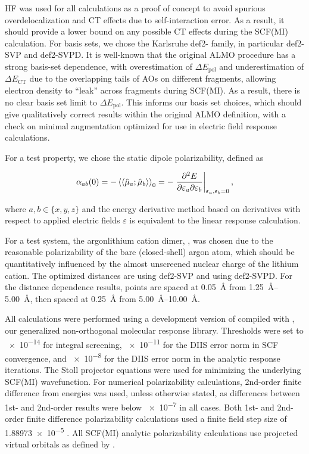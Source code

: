 \documentclass[%
  class = book,%
  crop = false,%
  float = true,%
  multi = true,%
  preview = false,%
]{standalone}
\let\cite\autocite
\newcommand{\arlidimer}{\ce{Ar\bond{....}Li+}}
\begin{document}
HF was used for all calculations as a proof of concept to avoid spurious overdelocalization and CT effects due to self-interaction error. As a result, it should provide a lower bound on any possible CT effects during the SCF(MI) calculation. For basis sets, we chose the Karlsruhe def2- family\cite{Weigend_2005_3297,Rappoport_2010_134105}, in particular def2-SVP and def2-SVPD. It is well-known that the original ALMO procedure has a strong basis-set dependence, with overestimation of \(\Delta E_{\text{pol}}\) and underestimation of \(\Delta E_{\text{CT}}\) due to the overlapping tails of AOs on different fragments, allowing electron density to ``leak'' across fragments during SCF(MI)\cite{doi:10.1063/1.4792434}. As a result, there is no clear basis set limit to \(\Delta E_{\text{pol}}\). This informs our basis set choices, which should give qualitatively correct results within the original ALMO definition, with a check on minimal augmentation optimized for use in electric field response calculations.

For a test property, we chose the static dipole polarizability, defined as

\begin{equation}
  \alpha_{ab}(0) = -\braket{\braket{\hat{\mu}_{a}; \hat{\mu}_{b}}}_{0} = -\left.\frac{\partial^{2} E}{\partial \varepsilon_a \partial \varepsilon_b}\right|_{\varepsilon_{a},\varepsilon_{b}=0},
\end{equation}

where \(a,b \in \{x,y,z\}\) and the energy derivative method based on derivatives with respect to applied electric fields \(\varepsilon\) is equivalent to the linear response calculation.

For a test system, the argon\textemdash{}lithium cation dimer, \arlidimer{}, was chosen due to the reasonable polarizability of the bare (closed-shell) argon atom, which should be quantitatively influenced by the almost unscreened nuclear charge of the lithium cation. The optimized distances are \geomdeftsvp{} using def2-SVP and \geomdeftsvpd{} using def2-SVPD. For the distance dependence results, points are spaced at \SI{0.05}{\angstrom} from \SIrange{1.25}{5.00}{\angstrom}, then spaced at \SI{0.25}{\angstrom} from \SIrange{5.00}{10.00}{\angstrom}.

All calculations were performed using a development version of \qchem{}\cite{Shao2015} compiled with \libresponse{}, our generalized non-orthogonal molecular response library. Thresholds were set to \num{e-14} for integral screening, \num{e-11} for the DIIS error norm in SCF convergence, and \num{e-8} for the DIIS error norm in the analytic response iterations. The Stoll projector equations were used for minimizing the underlying SCF(MI) wavefunction\cite{Stoll_1980_169,Khaliullin2006}. For numerical polarizability calculations, 2nd-order finite difference from energies was used, unless otherwise stated, as differences between 1st- and 2nd-order results were below \num{e-7} \aud{} in all cases. Both 1st- and 2nd-order finite difference polarizability calculations used a finite field step size of \num{1.88973e-5} \aud{}. All SCF(MI) analytic polarizability calculations use projected virtual orbitals as defined by .
\end{document}

